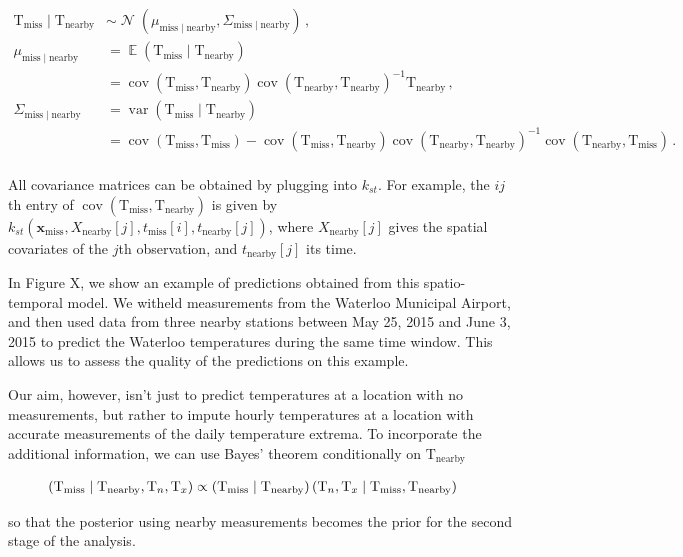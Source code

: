 \documentclass[letter]{article}
\newcommand{\genericdel}[3]{%
      \left#1#3\right#2
    }
\newcommand{\del}[1]{\genericdel(){#1}}
\newcommand{\sbr}[1]{\genericdel[]{#1}}
\let\Pr\relax
\DeclareMathOperator{\Pr}{\mathbb{P}}
\DeclareMathOperator{\E}{\mathbb{E}}
\DeclareMathOperator{\cov}{{cov}}
\DeclareMathOperator{\var}{{var}}
\DeclareMathOperator{\normal}{\mathcal{N}}
\newcommand{\T}{\mathrm{T}}
\newcommand{\Tn}{\T_{n}}
\newcommand{\Tx}{\T_{x}}
\newcommand{\xvec}{\mathbold{x}}
\newcommand{\miss}{\mathrm{miss}}
\newcommand{\obs}{\mathrm{nearby}}
\begin{document}
\begin{equation}
\begin{split}
    \T_\miss \mid \T_\obs &\sim \normal\del{\mu_{\miss \mid \obs}, \Sigma_{\miss \mid \obs}}\,, \\
    \mu_{\miss \mid \obs} &= \E \del{\T_\miss \mid \T_\obs} \\
        &= \cov\del{\T_\miss, \T_\obs} \cov\del{\T_\obs, \T_\obs}^{-1} \T_\obs\,, \\
    \Sigma_{\miss \mid \obs} &= \var \del{\T_\miss \mid \T_\obs} \\
        &= \cov\del{\T_\miss,\T_\miss} - \cov\del{\T_\miss, \T_\obs} \cov\del{\T_\obs, \T_\obs}^{-1} \cov\del{\T_\obs, \T_\miss}\,. \\ %
\end{split}
\end{equation}

All covariance matrices can be obtained by plugging into \(k_{st}\). For
example, the \(ij\)th entry of \(\cov\del{\T_\miss, \T_\obs}\) is given
by \(k_{st}(\xvec_\miss,X_\obs\sbr{j},t_\miss\sbr{i},t_\obs\sbr{j})\),
where \(X_\obs\sbr{j}\) gives the spatial covariates of the \(j\)th
observation, and \(t_\obs\sbr{j}\) its time.

In Figure X, we show an example of predictions obtained from this
spatio-temporal model. We witheld measurements from the Waterloo
Municipal Airport, and then used data from three nearby stations between
May 25, 2015 and June 3, 2015 to predict the Waterloo temperatures
during the same time window. This allows us to assess the quality of the
predictions on this example.
    


    	Our aim, however, isn't just to predict temperatures at a location with
no measurements, but rather to impute hourly temperatures at a location
with accurate measurements of the daily temperature extrema. To
incorporate the additional information, we can use Bayes' theorem
conditionally on \(\T_\obs\)

\begin{equation}
\begin{split}
    \Pr\del{\T_\miss \mid \T_\obs, \Tn, \Tx} &\propto \Pr\del{\T_\miss \mid \T_\obs} \Pr\del{\Tn, \Tx \mid \T_\miss, \T_\obs} 
\end{split}
\end{equation}

so that the posterior using nearby measurements becomes the prior for
the second stage of the analysis.
\end{document}
